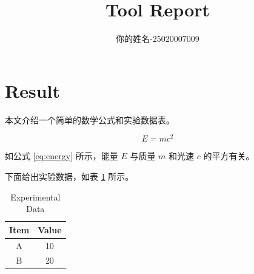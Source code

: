 \documentclass{article}
\begin{document}
\title{Tool Report}
\author{你的姓名-25020007009}
\maketitle

\section{Result}

本文介绍一个简单的数学公式和实验数据表。

\begin{equation}
E = mc^2
\label{eq:energy}
\end{equation}

如公式 \eqref{eq:energy} 所示，能量 $E$ 与质量 $m$ 和光速 $c$ 的平方有关。

下面给出实验数据，如表 \ref{tab:data} 所示。

\begin{table}[htbp]
    \centering
    \caption{Experimental Data}
    \label{tab:data}
    \begin{tabular}{cc}
        \hline
        Item & Value \\
        \hline
        A & 10 \\
        B & 20 \\
        \hline
    \end{tabular}
\end{table}
\end{document}
